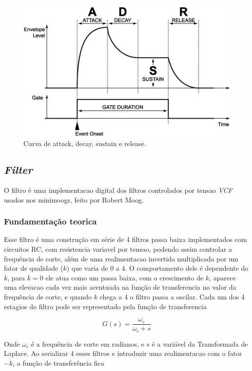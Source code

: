 \documentclass{article}
\begin{document}
\begin{figure}
\centering
\includegraphics[scale=0.3]{ADSR.png}\caption{Curva de attack, decay, sustain e release.}\label{fig:ADSR}
\end{figure}

\subsection{\emph{Filter}}


O filtro é uma implementacao digital dos filtros controlados por tensao \emph{VCF} usados nos minimoogs, feito por Robert Moog. 
\subsubsection{Fundamentação teorica}
Esse filtro
 é uma construção em série de 4 filtros passa baixa implementados com circuitos RC, com resistencia variavel por tensao, podendo assim controlar a
 frequência de corte, além de uma realimentacao invertida multiplicada por um fator de qualidade ($k$) que varia de 0 a 4.
O comportamento dele é dependente do $k$, para $k=0$ ele atua como um passa baixa, com o crescimento de $k$, aparece uma elevacao 
cada vez mais acentuada na função de transferencia no valor da frequência de corte, e quando $k$ chega a 4 o filtro passa a oscilar.
Cada um dos 4 estagios do filtro pode ser representado pela função de transferencia

\begin{equation}\label{eq:(1)}
G(s) = \frac{\omega_c}{\omega_c+s}  
\end{equation}

Onde $\omega_c$ é a frequência de corte em radianos, e $s$ é a variável da Transformada de Laplace.
Ao serializar 4 esses filtros e introduzir uma realimentacao com o fator $-k$, a função de transferência fica
\end{document}
